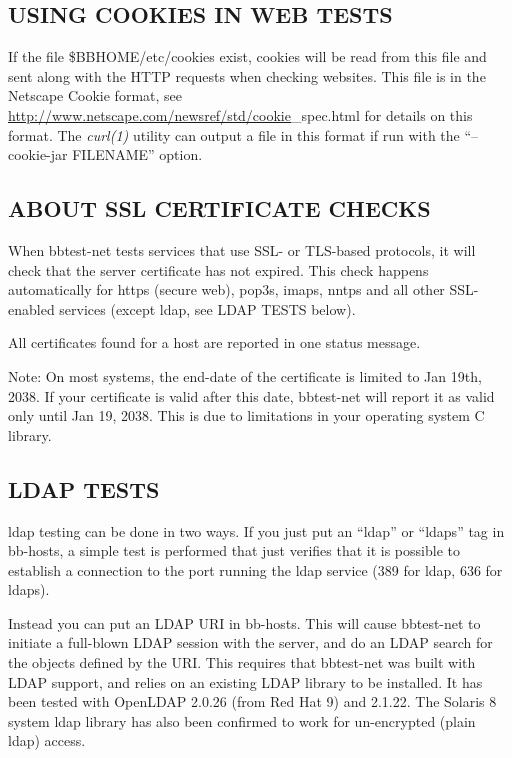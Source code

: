 \subsection{USING COOKIES IN WEB TESTS}
 If the file \$BBHOME/etc/cookies exist, cookies will be read from
 this file and sent along with the HTTP requests when checking
 websites. This file is in the Netscape Cookie format, see
 \url{http://www.netscape.com/newsref/std/cookie}\_spec.html for
 details on this format. The \emph{curl(1)} utility can output a file
 in this format if run with the ``--cookie-jar FILENAME'' option. 


 


 
\subsection{ABOUT SSL CERTIFICATE CHECKS}
 When bbtest-net tests services that use SSL- or TLS-based protocols,
 it will check that the server certificate has not expired. This check
 happens automatically for https (secure web), pop3s, imaps, nntps and
 all other SSL-enabled services (except ldap, see LDAP TESTS below). 


  All certificates found for a host are reported in one status message. 


  Note: On most systems, the end-date of the certificate is limited to
  Jan 19th, 2038. If your certificate is valid after this date,
  bbtest-net will report it as valid only until Jan 19, 2038. This is
  due to limitations in your operating system C library. 


 
\subsection{LDAP TESTS}
 ldap testing can be done in two ways. If you just put an ``ldap'' or
 ``ldaps'' tag in bb-hosts, a simple test is performed that just
 verifies that it is possible to establish a connection to the port
 running the ldap service (389 for ldap, 636 for ldaps). 


  Instead you can put an LDAP URI in bb-hosts. This will cause
  bbtest-net to initiate a full-blown LDAP session with the server,
  and do an LDAP search for the objects defined by the URI. This
  requires that bbtest-net was built with LDAP support, and relies on
  an existing LDAP library to be installed. It has been tested with
  OpenLDAP 2.0.26 (from Red Hat 9) and 2.1.22. The Solaris 8 system
  ldap library has also been confirmed to work for un-encrypted (plain
  ldap) access. 


